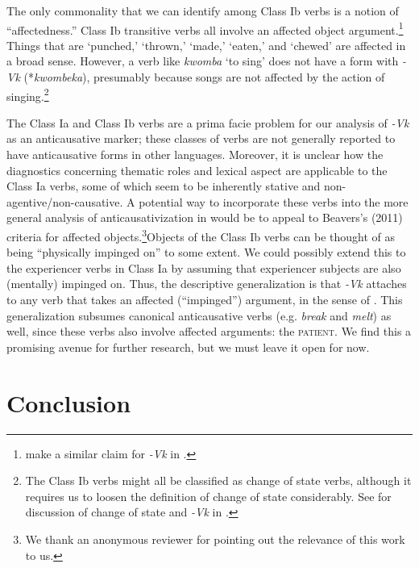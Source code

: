 \documentclass[output=paper]{langsci/lanmgscibook}
\begin{document}
The only commonality that we can identify among Class Ib verbs is a notion of “affectedness.” Class Ib transitive verbs all involve an affected object argument.\footnote{\citet{Dubinsky1996} make a similar claim for \textit{-Vk} in .} Things that are ‘punched,’ ‘thrown,’ ‘made,’ ‘eaten,’ and ‘chewed’ are affected in a broad sense. However, a verb like \textit{kwomba} ‘to sing’ does not have a form with \textit{-Vk} (*\textit{kwombeka}), presumably because songs are not affected by the action of singing.\footnote{The Class Ib verbs might all be classified as change of state verbs, although it requires us to loosen the definition of change of state considerably. See \citet{Dubinsky1996} for discussion of change of state and \textit{-Vk} in .}

The Class Ia and Class Ib verbs are a prima facie problem for our analysis of \textit{-Vk} as an anticausative marker; these classes of verbs are not generally reported to have anticausative forms in other languages. Moreover, it is unclear how the diagnostics concerning thematic roles and lexical aspect are applicable to the Class Ia verbs, some of which seem to be inherently stative and non-agentive/non-causative. A potential way to incorporate these verbs into the more general analysis of anticausativization in  would be to appeal to Beavers’s (2011) criteria for affected objects.\footnote{We thank an anonymous reviewer for pointing out the relevance of this work to us.}Objects of the Class Ib verbs can be thought of as being “physically impinged on” to some extent. We could possibly extend this to the experiencer verbs in Class Ia by assuming that experiencer subjects are also (mentally) impinged on. Thus, the descriptive generalization is that  \textit{-Vk} attaches to any verb that takes an affected (“impinged”) argument, in the sense of \citet{Beavers2011}. This generalization subsumes canonical anticausative verbs (e.g. \textit{break} and \textit{melt}) as well, since these verbs also involve affected arguments: the \textsc{patient}. We find this a promising avenue for further research, but we must leave it open for now.

\section{Conclusion}\label{sec:gluckman:6}
\end{document}
